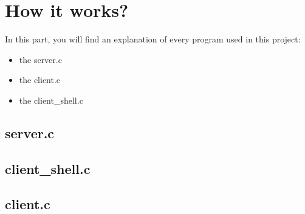 \chapter{How it works?}

In this part, you will find an explanation of every program used in this project:
\begin{itemize}
	\item the server.c
	\item the client.c
	\item the client\_shell.c
\end{itemize}


\section{server.c}



\section{client\_shell.c}


\section{client.c}